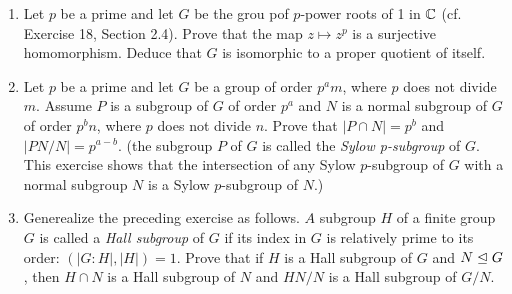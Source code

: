 \documentclass[10pt,a4paper]{report}
\begin{document}
\begin{enumerate}
\item Let $p$ be a prime and let $G$ be the grou pof $p$-power roots of 1 in $\mathbb{C}$ (cf. Exercise 18, Section 2.4).  Prove that the map $z \mapsto z^p$ is a surjective homomorphism.  Deduce that $G$ is isomorphic to a proper quotient of itself.

\item Let $p$ be a prime and let $G$ be a group of order $p^a m$, where $p$ does not divide $m$.  Assume $P$ is a subgroup of $G$ of order $p^a$ and $N$ is a normal subgroup of $G$ of order $p^b n$, where $p$ does not divide $n$.  Prove that $|P\cap N|=p^b$ and $|PN/N|=p^{a-b}$. (the subgroup $P$ of $G$ is called the \textit{Sylow p-subgroup} of $G$.  This exercise shows that the intersection of any Sylow $p$-subgroup of $G$ with a normal subgroup $N$ is a Sylow $p$-subgroup of $N$.)

\item Generealize the preceding exercise as follows.  $A$ subgroup $H$ of a finite group $G$ is called a \textit{Hall subgroup} of $G$ if its index in $G$ is relatively prime to its order:  $(|G:H|,|H|)=1$.  Prove that if $H$ is a Hall subgroup of $G$ and $N \trianglelefteq G$, then $H\cap N$ is a Hall subgroup of $N$ and $HN/N$ is a Hall subgroup of $G/N$.
\end{enumerate}
\end{document}
